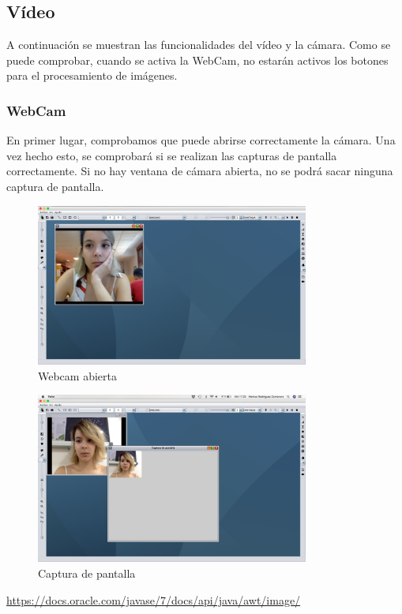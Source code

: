 \subsection{Vídeo}
A continuación se muestran las funcionalidades del vídeo y la cámara. Como se puede comprobar, cuando se activa la WebCam, no estarán activos los botones para el procesamiento de imágenes.
\subsubsection{WebCam}
En primer lugar, comprobamos que puede abrirse correctamente la cámara. Una vez hecho esto, se comprobará si se realizan las capturas de pantalla correctamente. Si no hay ventana de cámara abierta, no se podrá sacar ninguna captura de pantalla.
\vskip0.3cm
\begin{figure}[H]
 \centering
  \includegraphics[width=0.8\textwidth]{video/webcam.jpg}
 \caption{Webcam abierta}
 \label{diseño}
 \end{figure}
 \vskip0.3cm
\begin{figure}[H]
 \centering
  \includegraphics[width=0.8\textwidth]{video/captura.jpg}
 \caption{Captura de pantalla}
 \label{diseño}
 \end{figure}


\clearpage
\begin{thebibliography}{X}
\bibitem{} \url{https://docs.oracle.com/javase/7/docs/api/java/awt/image/}
\end{thebibliography}

